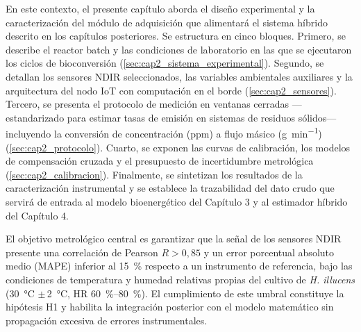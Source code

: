 En este contexto, el presente capítulo aborda el diseño experimental y la caracterización del módulo de adquisición que alimentará el sistema híbrido descrito en los capítulos posteriores. Se estructura en cinco bloques. Primero, se describe el reactor batch y las condiciones de laboratorio en las que se ejecutaron los ciclos de bioconversión (\autoref{sec:cap2_sistema_experimental}). Segundo, se detallan los sensores NDIR seleccionados, las variables ambientales auxiliares y la arquitectura del nodo IoT con computación en el borde (\autoref{sec:cap2_sensores}). Tercero, se presenta el protocolo de medición en ventanas cerradas ---estandarizado para estimar tasas de emisión en sistemas de residuos sólidos--- incluyendo la conversión de concentración (ppm) a flujo másico (\si{\gram\per\minute}) (\autoref{sec:cap2_protocolo}). Cuarto, se exponen las curvas de calibración, los modelos de compensación cruzada y el presupuesto de incertidumbre metrológica (\autoref{sec:cap2_calibracion}). Finalmente, se sintetizan los resultados de la caracterización instrumental y se establece la trazabilidad del dato crudo que servirá de entrada al modelo bioenergético del Capítulo 3 y al estimador híbrido del Capítulo 4.

El objetivo metrológico central es garantizar que la señal de los sensores NDIR presente una correlación de Pearson $R > 0{,}85$ y un error porcentual absoluto medio (MAPE) inferior al \SI{15}{\percent} respecto a un instrumento de referencia, bajo las condiciones de temperatura y humedad relativas propias del cultivo de \textit{H. illucens} (\SI{30}{\celsius} $\pm$\,\SI{2}{\celsius}, HR \SI{60}{\percent}--\SI{80}{\percent}). El cumplimiento de este umbral constituye la hipótesis H1 y habilita la integración posterior con el modelo matemático sin propagación excesiva de errores instrumentales.
